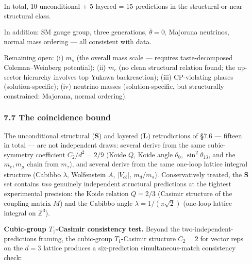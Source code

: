 \documentclass[
]{article}
\begin{document}
In total, 10 unconditional + 5 layered = 15 predictions in the
structural-or-near-structural class.

In addition: SM gauge group, three generations, \(\bar\theta = 0\),
Majorana neutrinos, normal mass ordering --- all consistent with data.

Remaining open: (i) \(m_s\) (the overall mass scale --- requires
taste-decomposed Coleman--Weinberg potential); (ii) \(m_c\) (no clean
structural relation found; the up-sector hierarchy involves top Yukawa
backreaction); (iii) CP-violating phases (solution-specific); (iv)
neutrino masses (solution-specific, but structurally constrained:
Majorana, normal ordering).

\hypertarget{the-coincidence-bound}{%
\subsubsection{7.7 The coincidence bound}\label{the-coincidence-bound}}

The unconditional structural (\textbf{S}) and layered (\textbf{L})
retrodictions of §7.6 --- fifteen in total --- are not independent
draws: several derive from the same cubic-symmetry coefficient
\(C_2/d^2 = 2/9\) (Koide \(Q\), Koide angle \(\theta_0\),
\(\sin^2\theta_{13}\), and the \(m_e, m_\mu\) chain from \(m_\tau\)),
and several derive from the same one-loop lattice integral structure
(Cabibbo \(\lambda\), Wolfenstein \(A\), \(|V_{cb}|\), \(m_d/m_s\)).
Conservatively treated, the \textbf{S} set contains \emph{two} genuinely
independent structural predictions at the tightest experimental
precision: the Koide relation \(Q = 2/3\) (Casimir structure of the
coupling matrix \(M\)) and the Cabibbo angle
\(\lambda = 1/(\pi\sqrt{2})\) (one-loop lattice integral on
\(\mathbb{Z}^3\)).

\textbf{Cubic-group \(T_1\)-Casimir consistency test.} Beyond the
two-independent-predictions framing, the cubic-group \(T_1\)-Casimir
structure \(C_2 = 2\) for vector reps on the \(d = 3\) lattice produces
a six-prediction simultaneous-match consistency check:
\end{document}
